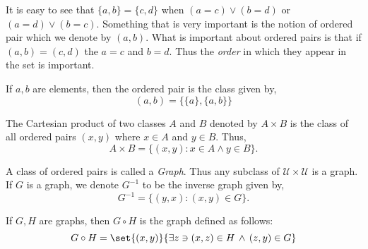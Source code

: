 It is easy to see that $\lbrace a,b \rbrace = \lbrace c,d \rbrace$ 
when $(a = c) \lor (b = d)$ or $ (a = d) \lor (b = c)$. Something that is very important is the notion of
ordered pair which we denote by $(a,b)$. What is important about ordered pairs is that if 
$(a,b) = (c,d)$ the $a = c$ and $b = d$. Thus the \textit{order} in which they appear in the set is
important.

\begin{Definition}
    If $a,b$ are elements, then the ordered pair is the class given by,
    \begin{equation*}
	(a,b) = \left.\lbrace \lbrace a \rbrace, \lbrace a,b \rbrace \rbrace\right.
    \end{equation*}
\end{Definition}

\begin{Definition}
    The Cartesian product of two classes $A$ and $B$ denoted by $A \times B$ 
    is the class of all ordered pairs $(x,y)$ where $x \in A$ and $y \in B$. Thus,
    \begin{equation*}
	A \times B = \left.\lbrace (x,y) : x \in A \land y \in B \right.\rbrace.
    \end{equation*}
\end{Definition}

A class of ordered pairs is called a \textit{Graph}. Thus any subclass of $\mathcal{U} \times
\mathcal{U}$ is a graph. If $G$ is a graph, we denote $G^{-1}$ to be the inverse graph given by,
\begin{equation*}
    G^{-1} = \left.\lbrace (y,x) : (x,y) \in G \right.\rbrace.
\end{equation*}

\begin{Definition}
    If $G,H$ are graphs, then $G \circ H$ is the graph defined as follows:
    \begin{equation*}
	G \circ H = \set{(x,y)}{\exists z \ni (x,z) \in H \, \land \, (z,y) \in G}
    \end{equation*}
\end{Definition}


